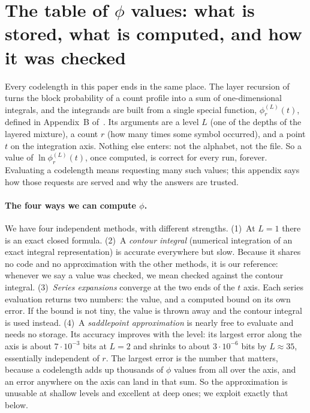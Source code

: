 \documentclass[11pt]{article}
\begin{document}
\section{The table of $\phi$ values: what is stored, what is
computed, and how it was checked}
\label{app:store}

Every codelength in this paper ends in the same place.  The layer
recursion of~\cite{layered2026} turns the block probability of a
count profile into a sum of one-dimensional integrals, and the
integrands are built from a single special function,
$\phi_r^{(L)}(t)$, defined in Appendix~B of~\cite{layered2026}.  Its
arguments are a level $L$ (one of the depths of the layered mixture),
a count $r$ (how many times some symbol occurred), and a point $t$ on
the integration axis.  Nothing else enters: not the alphabet, not the
file.  So a value of $\ln \phi_r^{(L)}(t)$, once computed, is correct
for every run, forever.  Evaluating a codelength means requesting
many such values; this appendix says how those requests are served
and why the answers are trusted.

\paragraph{The four ways we can compute $\phi$.}
We have four independent methods, with different strengths.
(1)~At $L = 1$ there is an exact closed formula.
(2)~A \emph{contour integral} (numerical integration of an exact
integral representation) is accurate everywhere but slow.  Because it
shares no code and no approximation with the other methods, it is our
reference: whenever we say a value was checked, we mean checked
against the contour integral.
(3)~\emph{Series expansions} converge at the two ends of the $t$
axis.  Each series evaluation returns two numbers: the value, and a
computed bound on its own error.  If the bound is not tiny, the value
is thrown away and the contour integral is used instead.
(4)~A \emph{saddlepoint approximation} is nearly free to evaluate and
needs no storage.  Its accuracy improves with the level: its largest
error along the axis is about $7 \cdot 10^{-3}$ bits at $L = 2$ and
shrinks to about $3 \cdot 10^{-6}$ bits by $L \approx 35$,
essentially independent of $r$.  The largest error is the number that
matters, because a codelength adds up thousands of $\phi$ values from
all over the axis, and an error anywhere on the axis can land in that
sum.  So the approximation is unusable at shallow levels and
excellent at deep ones; we exploit exactly that below.
\end{document}
